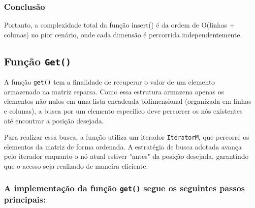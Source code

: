 \documentclass[12pt]{article}
\begin{document}
    \subsubsection{Conclusão}
    Portanto, a complexidade total da função insert() é da ordem de O(linhas + colunas) no pior cenário, onde cada dimensão é percorrida independentemente.
    
    \subsection{Função \texttt{Get()}}

    A função \texttt{get()} tem a finalidade de recuperar o valor de um elemento armazenado na matriz esparsa. Como essa estrutura armazena apenas os elementos não nulos em uma lista encadeada bidimensional (organizada em linhas e colunas), a busca por um elemento específico deve percorrer os nós existentes até encontrar a posição desejada.  
    
    Para realizar essa busca, a função utiliza um iterador \texttt{IteratorM}, que percorre os elementos da matriz de forma ordenada. A estratégia de busca adotada avança pelo iterador enquanto o nó atual estiver "antes" da posição desejada, garantindo que o acesso seja realizado de maneira eficiente.  

        \subsubsection{A implementação da função \texttt{get()} segue os seguintes passos principais:} 
    
\end{document}
